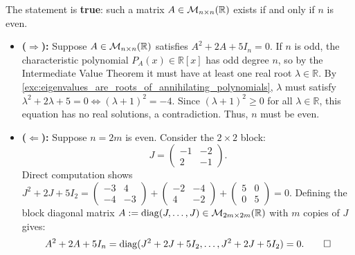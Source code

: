 \begin{exercisesolution}
\label{sol:annihilating_quadratic_even_dimension}
The statement is \textbf{true}: such a matrix $A \in \mathcal{M}_{n \times n}(\mathbb{R})$ exists if and only if $n$ is even.
\begin{itemize}
    \item \textbf{($\Rightarrow$):} Suppose $A \in \mathcal{M}_{n \times n}(\mathbb{R})$ satisfies $A^2 + 2A + 5I_n = 0$.
    If $n$ is odd, the characteristic polynomial $P_A(x) \in \mathbb{R}[x]$ has odd degree $n$, so by the Intermediate Value Theorem it must have at least one real root $\lambda \in \mathbb{R}$.
    By \cref{exc:eigenvalues_are_roots_of_annihilating_polynomials}, $\lambda$ must satisfy $\lambda^2 + 2\lambda + 5 = 0 \iff (\lambda + 1)^2 = -4$.
    Since $(\lambda + 1)^2 \ge 0$ for all $\lambda \in \mathbb{R}$, this equation has no real solutions, a contradiction. Thus, $n$ must be even.

    \item \textbf{($\Leftarrow$):} Suppose $n = 2m$ is even. Consider the $2 \times 2$ block:
    \[
    J = \begin{pmatrix} -1 & -2 \\ 2 & -1 \end{pmatrix}.
    \]
    Direct computation shows $J^2 + 2J + 5I_2 = \left(\begin{smallmatrix} -3 & 4 \\ -4 & -3 \end{smallmatrix}\right) + \left(\begin{smallmatrix} -2 & -4 \\ 4 & -2 \end{smallmatrix}\right) + \left(\begin{smallmatrix} 5 & 0 \\ 0 & 5 \end{smallmatrix}\right) = 0$.
    Defining the block diagonal matrix $A := \operatorname{diag}(J, \dots, J) \in \mathcal{M}_{2m \times 2m}(\mathbb{R})$ with $m$ copies of $J$ gives:
    \[
    A^2 + 2A + 5I_n = \operatorname{diag}(J^2 + 2J + 5I_2, \dots, J^2 + 2J + 5I_2) = 0. \qedhere
    \]
\end{itemize}
\end{exercisesolution}

